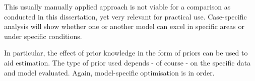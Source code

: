 This usually manually applied approach is not viable for a comparison as conducted in this dissertation, yet very relevant for practical use. Case-specific analysis will show whether one or another model can excel in specific areas or under specific conditions. 

In particular, the effect of prior knowledge in the form of priors can be used to aid estimation. The type of prior used  depends - of course - on the specific data and model evaluated. Again, model-specific optimisation is in order. 
